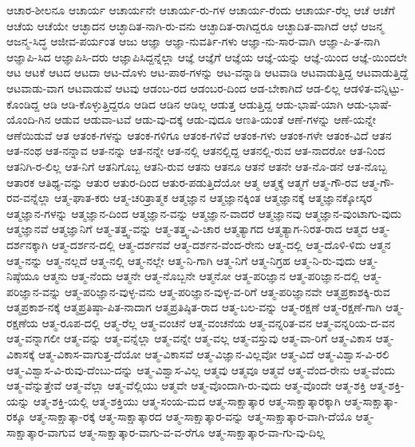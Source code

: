ಆಚಾರ-ಶೀಲನೂ
ಆಚಾರ್ಯ
ಆಚಾರ್ಯನೇ
ಆಚಾರ್ಯ-ರು-ಗಳ
ಆಚಾರ್ಯ-ರೆಂದು
ಆಚಾರ್ಯ-ರೆಲ್ಲ
ಆಚೆ
ಆಚೆಗೆ
ಆಚೆಯ
ಆಚೆಯೇ
ಆಚ್ಛಾದನ
ಆಚ್ಛಾದಿತ-ನಾಗಿ-ರು-ವನು
ಆಚ್ಛಾದಿತ-ರಾಗಿದ್ದರೂ
ಆಚ್ಛಾದಿತ-ವಾಗಿದೆ
ಆಛೆ
ಆಜನ್ಮ
ಆಜನ್ಮ-ಸಿದ್ಧ
ಆಜೀವ-ಪರ್ಯಂತ
ಆಜು
ಆಜ್ಞಾ
ಆಜ್ಞಾ-ನುವರ್ತಿ-ಗಳು
ಆಜ್ಞಾ-ನು-ಸಾರ-ವಾಗಿ
ಆಜ್ಞಾ-ಪಿ-ತ-ನಾಗಿ
ಆಜ್ಞಾಪಿ-ಸಿದ
ಆಜ್ಞಾಪಿಸಿ-ದರು
ಆಜ್ಞಾಪಿಸಿದ್ದನ್ನೆಲ್ಲಾ
ಆಜ್ಞೆ
ಆಜ್ಞೆಗೆ
ಆಜ್ಞೆಯ
ಆಜ್ಞೆ-ಯನ್ನು
ಆಜ್ಞೆ-ಯಿಂದ
ಆಜ್ಞೆ-ಯಿಂದಲೇ
ಆಟ
ಆಟಕೆ
ಆಟದ
ಆಟದಾ
ಆಟ-ದೊಳು
ಆಟ-ಪಾಠ-ಗಳನ್ನು
ಆಟ-ವನ್ನಾಡಿ
ಆಟವಾಡಿ
ಆಟವಾಡುತ್ತಿದ್ದ
ಆಟವಾಡುತ್ತಿದ್ದೆ
ಆಟವಾಡು-ವಾಗ
ಆಟವಾಡುವೆ
ಆಟವು
ಆಡಂಬ-ರದ
ಆಡಂಬರ-ದಿಂದ
ಆಡ-ಬೇಕಾಗಿದೆ
ಆಡ-ಲಿಲ್ಲ
ಆಡಳಿತ-ವನ್ನಿಟ್ಟು-ಕೊಂಡಿದ್ದ
ಆಡಿ
ಆಡಿ-ಕೊಳ್ಳುತ್ತಿದ್ದರೂ
ಆಡಿದ
ಆಡಿನ
ಆಡಿಲ್ಲ
ಆಡುತ್ತ
ಆಡುತ್ತಿದ್ದ
ಆಡು-ಭಾಷೆ-ಯಾಗಿ
ಆಡು-ಭಾಷೆ-ಯೊಂದಿ-ಗಿನ
ಆಡುವ
ಆಡುವಾ-ಟವೆ
ಆಡು-ವು-ದಕ್ಕೆ
ಆಡು-ವುದೂ
ಆಣತಿ-ಯಂತೆ
ಆಣೆ-ಗಳನ್ನು
ಆಣೆ-ಯನ್ನೇ
ಆಣೆಯಿಡುವೆ
ಆತ
ಆತಂಕ-ಗಳನ್ನು
ಆತಂಕ-ಗಳಿಗೂ
ಆತಂಕ-ಗಳಿವೆ
ಆತಂಕ-ಗಳು
ಆತಂಕ-ಗಳೇ
ಆತಂಕ-ವಿದೆ
ಆತನ
ಆತ-ನಂಥ
ಆತ-ನನ್ನಾವ
ಆತ-ನನ್ನು
ಆತ-ನನ್ನೇ
ಆತ-ನಲ್ಲಿ
ಆತನಲ್ಲಿದ್ದ
ಆತನಲ್ಲಿ-ರುವ
ಆತ-ನಾದರೋ
ಆತ-ನಿಂದ
ಆತನಿಗಿ-ರ-ಲಿಲ್ಲ
ಆತ-ನಿಗೆ
ಆತನಿಗೊಬ್ಬ
ಆತನಿ-ರುವ
ಆತನು
ಆತನೂ
ಆತನೆ
ಆತನೇ
ಆತ-ನೊ-ಡನೆ
ಆತ-ನೊಬ್ಬ
ಆತಾರಕ
ಆತಿಥ್ಯ-ವನ್ನು
ಆತುರ
ಆತುರ-ದಿಂದ
ಆತುರ-ಪಡುತ್ತಿದೆಯೋ
ಆತ್ಮ
ಆತ್ಮಕ್ಕೆ
ಆತ್ಮಗೆ
ಆತ್ಮ-ಗೌ-ರವ
ಆತ್ಮ-ಗೌ-ರವ-ವನ್ನೆಲ್ಲಾ
ಆತ್ಮ-ಘಾತ-ಕರು
ಆತ್ಮ-ಚರಿತ್ರಾತ್ಮಕ
ಆತ್ಮಜ್ಞಾನ
ಆತ್ಮಜ್ಞಾನಕ್ಕಿಂತ
ಆತ್ಮಜ್ಞಾನಕ್ಕೆ
ಆತ್ಮಜ್ಞಾನಕ್ಕೋಸ್ಕರ
ಆತ್ಮಜ್ಞಾನ-ಗಳನ್ನು
ಆತ್ಮಜ್ಞಾನ-ದಿಂದ
ಆತ್ಮಜ್ಞಾನ-ವನ್ನು
ಆತ್ಮಜ್ಞಾನ-ವಾದರೆ
ಆತ್ಮಜ್ಞಾನವು
ಆತ್ಮಜ್ಞಾನ-ವುಂಟಾಗು-ವುದು
ಆತ್ಮಜ್ಞಾನವೆ
ಆತ್ಮಜ್ಞಾನಿಗೆ
ಆತ್ಮ-ತತ್ತ್ವ-ವನ್ನು
ಆತ್ಮ-ತತ್ತ್ವ-ವಿ-ಚಾರ
ಆತ್ಮತ್ಯಾಗದ
ಆತ್ಮತ್ಯಾಗ-ನಿರತ-ರಾದ
ಆತ್ಮದ
ಆತ್ಮ-ದರ್ಶನಕ್ಕಾಗಿ
ಆತ್ಮ-ದರ್ಶನ-ದಲ್ಲಿ
ಆತ್ಮ-ದರ್ಶನವೆ
ಆತ್ಮ-ದರ್ಶನ-ವೆಂದ-ರೇನು
ಆತ್ಮ-ದಲ್ಲಿ
ಆತ್ಮ-ದೊಳಿ-ಳಿದು
ಆತ್ಮನ
ಆತ್ಮ-ನನ್ನು
ಆತ್ಮ-ನಲ್ಲದೆ
ಆತ್ಮ-ನಲ್ಲಿ
ಆತ್ಮ-ನಲ್ಲೇ
ಆತ್ಮ-ನಿ-ಗಾಗಿ
ಆತ್ಮ-ನಿಗೆ
ಆತ್ಮ-ನಿಗ್ರಹ
ಆತ್ಮ-ನಿ-ರು-ವುದು
ಆತ್ಮ-ನಿಷ್ಠೆಯೂ
ಆತ್ಮನು
ಆತ್ಮ-ನೆಂದು
ಆತ್ಮನೇ
ಆತ್ಮ-ನೊಬ್ಬನೇ
ಆತ್ಮನೋ
ಆತ್ಮ-ಪರಿಜ್ಞಾನ
ಆತ್ಮ-ಪರಿಜ್ಞಾನ-ದಲ್ಲಿ
ಆತ್ಮ-ಪರಿಜ್ಞಾನ-ವನ್ನು
ಆತ್ಮ-ಪರಿಜ್ಞಾನ-ವುಳ್ಳ-ವನು
ಆತ್ಮ-ಪರಿಜ್ಞಾನ-ವುಳ್ಳ-ವ-ರಿಗೆ
ಆತ್ಮ-ಪರಿಜ್ಞಾನವೇ
ಆತ್ಮಪ್ರಕಾಶಕ್ಕಿ-ರುವ
ಆತ್ಮಪ್ರಕಾಶ-ನಕ್ಕೆ
ಆತ್ಮಪ್ರತಿಷ್ಠಾ-ಪಿತ-ನಾದಾಗ
ಆತ್ಮಪ್ರತಿಷ್ಠಿತ-ರಾದ
ಆತ್ಮ-ಬಲ-ವನ್ನು
ಆತ್ಮ-ರಕ್ಷಣೆ
ಆತ್ಮ-ರಕ್ಷಣೆ-ಗಾಗಿ
ಆತ್ಮ-ರಕ್ಷಣೆಯ
ಆತ್ಮ-ರೂಪ-ದಲ್ಲಿ
ಆತ್ಮ-ರೆಲ್ಲ
ಆತ್ಮ-ವಂಚನೆ
ಆತ್ಮ-ವಂಚನೆಯ
ಆತ್ಮ-ವನ್ನರಿತ-ವನ
ಆತ್ಮ-ವನ್ನರಿಯ-ದ-ವನ
ಆತ್ಮ-ವನ್ನಾಗಲೀ
ಆತ್ಮ-ವನ್ನು
ಆತ್ಮ-ವನ್ನೆಲ್ಲಾ
ಆತ್ಮ-ವನ್ನೇ
ಆತ್ಮ-ವಲ್ಲ
ಆತ್ಮ-ವಸ್ತುವು
ಆತ್ಮ-ವಾ-ರಿಗೆ
ಆತ್ಮ-ವಿಕಾಸ
ಆತ್ಮ-ವಿಕಾಸಕ್ಕೆ
ಆತ್ಮ-ವಿಕಾಸ-ವಾಗುತ್ತ-ದೆಯೋ
ಆತ್ಮ-ವಿಕಾಸವೆ
ಆತ್ಮ-ವಿಜ್ಞಾನ-ವಿಲ್ಲವೋ
ಆತ್ಮ-ವಿದೆ
ಆತ್ಮ-ವಿಶ್ವಾಸ-ವಿ-ರಲಿ
ಆತ್ಮ-ವಿಶ್ವಾಸ-ವಿ-ರುವು-ದೆಂಬು-ದನ್ನು
ಆತ್ಮ-ವಿಶ್ವಾಸ-ವಿಲ್ಲ
ಆತ್ಮವು
ಆತ್ಮವೂ
ಆತ್ಮವೆ
ಆತ್ಮ-ವೆಂದ-ರೇನು
ಆತ್ಮ-ವೆಂದು
ಆತ್ಮ-ವೆನ್ನುತ್ತೇವೆ
ಆತ್ಮ-ವೆಲ್ಲಾ
ಆತ್ಮ-ವೆಲ್ಲಿಯು
ಆತ್ಮವೇ
ಆತ್ಮ-ವೊಂದಾಗಿ-ರು-ವುದು
ಆತ್ಮ-ವೊಂದೇ
ಆತ್ಮ-ಶಕ್ತಿ
ಆತ್ಮ-ಶಕ್ತಿ-ಯನ್ನು
ಆತ್ಮ-ಶಕ್ತಿ-ಯಲ್ಲಿ
ಆತ್ಮ-ಶಕ್ತಿಯು
ಆತ್ಮ-ಸಂಯ-ಮದ
ಆತ್ಮ-ಸಾಕ್ಷಾತ್ಕಾರ
ಆತ್ಮ-ಸಾಕ್ಷಾತ್ಕಾರಕ್ಕಾಗಿ
ಆತ್ಮ-ಸಾಕ್ಷಾತ್ಕಾ-ರಕ್ಕೂ
ಆತ್ಮ-ಸಾಕ್ಷಾತ್ಕಾ-ರಕ್ಕೆ
ಆತ್ಮ-ಸಾಕ್ಷಾತ್ಕಾರದ
ಆತ್ಮ-ಸಾಕ್ಷಾತ್ಕಾರ-ವನ್ನು
ಆತ್ಮ-ಸಾಕ್ಷಾತ್ಕಾರ-ವಾಗಿ-ದೆಯೊ
ಆತ್ಮ-ಸಾಕ್ಷಾತ್ಕಾರ-ವಾಗುವ
ಆತ್ಮ-ಸಾಕ್ಷಾತ್ಕಾರ-ವಾಗು-ವ-ವ-ರೆಗೂ
ಆತ್ಮ-ಸಾಕ್ಷಾತ್ಕಾರ-ವಾ-ಗು-ವು-ದಿಲ್ಲ
